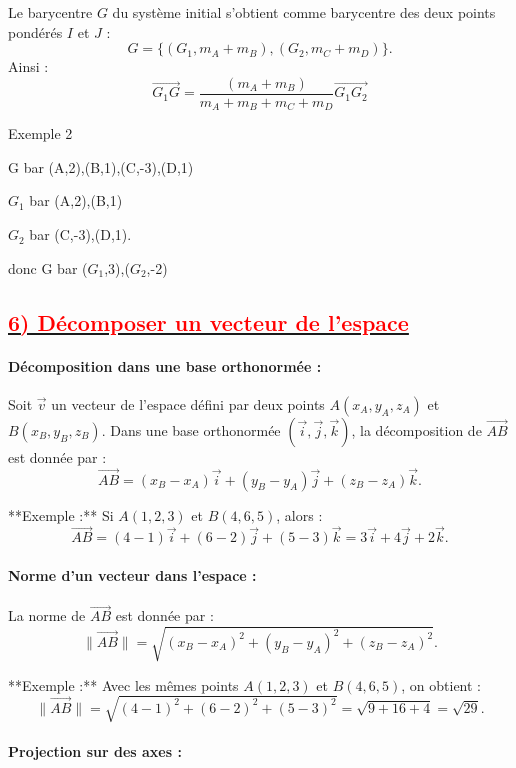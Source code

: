 \documentclass{article}
\begin{document}
   Le barycentre \( G \) du système initial s’obtient comme barycentre des deux points pondérés \( I \) et \( J \) :  
   \[
   G = \{(G_{1}, m_A + m_B), (G_{2}, m_C + m_D)\}.
   \]
   Ainsi :  
   \[
   \overrightarrow{G_{1}G} = \frac{(m_A + m_B) }{m_A + m_B+m_C + m_D}\overrightarrow{G_{1}G_{2}}
   \]

Exemple 2

G bar (A,2),(B,1),(C,-3),(D,1)

$G_{1}$ bar (A,2),(B,1)

$G_{2}$ bar (C,-3),(D,1).

donc G bar ($G_{1}$,3),($G_{2}$,-2)

\subsection*{\underline{\textbf{\textcolor{red}{6) Décomposer un vecteur de l’espace}}}}

\paragraph{Décomposition dans une base orthonormée :}

Soit \( \vec{v} \) un vecteur de l’espace défini par deux points \( A(x_A, y_A, z_A) \) et \( B(x_B, y_B, z_B) \).  
Dans une base orthonormée \((\vec{i}, \vec{j}, \vec{k})\), la décomposition de \( \overrightarrow{AB} \) est donnée par :  
\[
\overrightarrow{AB} = (x_B - x_A) \vec{i} + (y_B - y_A) \vec{j} + (z_B - z_A) \vec{k}.
\]

**Exemple :**  
Si \( A(1, 2, 3) \) et \( B(4, 6, 5) \), alors :  
\[
\overrightarrow{AB} = (4 - 1)\vec{i} + (6 - 2)\vec{j} + (5 - 3)\vec{k} = 3\vec{i} + 4\vec{j} + 2\vec{k}.
\]

\paragraph{Norme d’un vecteur dans l’espace :}

La norme de \( \overrightarrow{AB} \) est donnée par :  
\[
\|\overrightarrow{AB}\| = \sqrt{(x_B - x_A)^2 + (y_B - y_A)^2 + (z_B - z_A)^2}.
\]

**Exemple :**  
Avec les mêmes points \( A(1, 2, 3) \) et \( B(4, 6, 5) \), on obtient :  
\[
\|\overrightarrow{AB}\| = \sqrt{(4-1)^2 + (6-2)^2 + (5-3)^2} = \sqrt{9 + 16 + 4} = \sqrt{29}.
\]

\paragraph{Projection sur des axes :}
\end{document}
